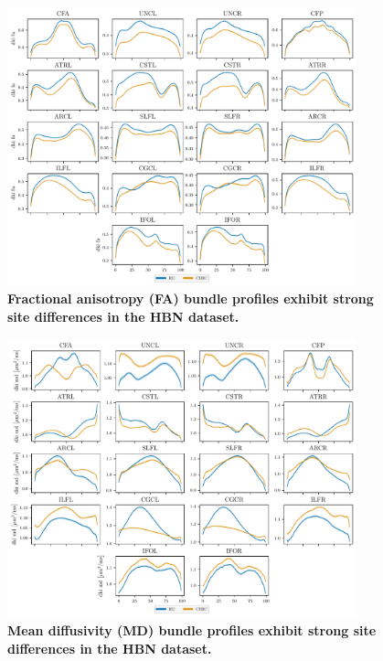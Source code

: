 \documentclass[10pt,letterpaper]{article}
\begin{document}
\begin{figure}
    \includegraphics[width=0.9\textwidth]{hbn_site_profiles_fa.pdf}
    \caption{%
        {%
            \bf Fractional anisotropy (FA) bundle profiles
            exhibit strong site differences in the HBN dataset.
        }
        \label{fig:hbn-site-bp:fa}
    }
\end{figure}

\begin{figure}
    \includegraphics[width=0.9\textwidth]{hbn_site_profiles_md.pdf}
    \caption{%
        {%
            \bf Mean diffusivity (MD) bundle profiles
            exhibit strong site differences in the HBN dataset.
        }
        \label{fig:hbn-site-bp:md}
    }
\end{figure}
\end{document}
